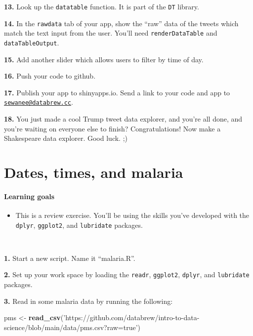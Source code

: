 \documentclass[]{book}
\newenvironment{Shaded}{\begin{snugshade}}{\end{snugshade}}
\newcommand{\KeywordTok}[1]{\textcolor[rgb]{0.13,0.29,0.53}{\textbf{#1}}}
\newcommand{\NormalTok}[1]{#1}
\newcommand{\StringTok}[1]{\textcolor[rgb]{0.31,0.60,0.02}{#1}}
\providecommand{\tightlist}{%
  \setlength{\itemsep}{0pt}\setlength{\parskip}{0pt}}
\begin{document}
\textbf{13.} Look up the \texttt{datatable} function. It is part of the \texttt{DT} library.

\textbf{14.} In the \texttt{rawdata} tab of your app, show the ``raw'' data of the tweets which match the text input from the user. You'll need \texttt{renderDataTable} and \texttt{dataTableOutput}.

\textbf{15.} Add another slider which allows users to filter by time of day.

\textbf{16.} Push your code to github.

\textbf{17.} Publish your app to shinyapps.io. Send a link to your code and app to \href{mailto:sewanee@databrew.cc}{\nolinkurl{sewanee@databrew.cc}}.

\textbf{18.} You just made a cool Trump tweet data explorer, and you're all done, and you're waiting on everyone else to finish? Congratulations! Now make a Shakespeare data explorer. Good luck. ;)

\hypertarget{dates-times-and-malaria}{%
\chapter{Dates, times, and malaria}\label{dates-times-and-malaria}}

\hypertarget{learning-goals-25}{%
\subsubsection*{Learning goals}\label{learning-goals-25}}

\begin{itemize}
\tightlist
\item
  This is a review exercise. You'll be using the skills you've developed with the \texttt{dplyr}, \texttt{ggplot2}, and \texttt{lubridate} packages.
\end{itemize}

~

\textbf{1.} Start a new script. Name it ``malaria.R''.

\textbf{2.} Set up your work space by loading the \texttt{readr}, \texttt{ggplot2}, \texttt{dplyr}, and \texttt{lubridate} packages.

\textbf{3.} Read in some malaria data by running the following:

\begin{Shaded}
\begin{Highlighting}[]
\NormalTok{pms <-}\StringTok{ }\KeywordTok{read_csv}\NormalTok{(}\StringTok{'https://github.com/databrew/intro-to-data-science/blob/main/data/pms.csv?raw=true'}\NormalTok{)}
\end{Highlighting}
\end{Shaded}
\end{document}
